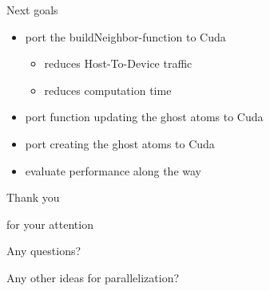 \documentclass[ignorenonframetext,aspectratio=169]{beamer}
\begin{document}
\begin{frame}{Next goals}
    \vspace{-3\baselineskip}
    \begin{itemize}
        \item port the buildNeighbor-function to Cuda
    \begin{itemize}
        \item reduces Host-To-Device traffic
        \item reduces computation time
    \end{itemize}
    \item port function updating the ghost atoms to Cuda
    \item port creating the ghost atoms to Cuda
    
    \vspace{\baselineskip}
    \item evaluate performance along the way
    \end{itemize}


\end{frame}

\begin{frame}
    \begin{center}
        \color{blue}
        \begin{Huge}
        Thank you 
        
        for your attention
    \end{Huge}
    \vspace{\baselineskip}

    \color{black}
    \begin{LARGE}
        Any questions?
    \end{LARGE}

    \begin{large}
        Any other ideas for parallelization?
    \end{large}
    \end{center}


\end{frame}
\end{document}
